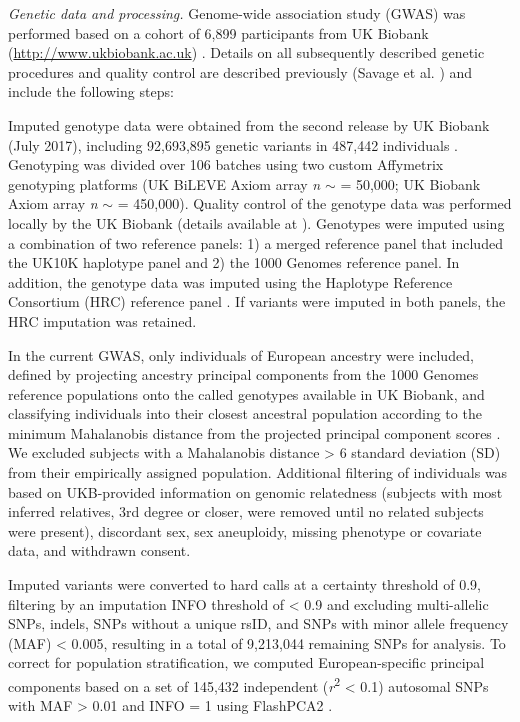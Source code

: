 \begin{refsection}
\noindent
\textit{Genetic data and processing.} Genome-wide association study (GWAS) was performed based on a cohort of 6,899 participants from UK Biobank (\url{http://www.ukbiobank.ac.uk}) \citep{sudlow2015uk}. Details on all subsequently described genetic procedures and quality control are described previously (Savage et al. \citep{Savage2018GenomewideAM}) and include the following steps:

Imputed genotype data were obtained from the second release by UK Biobank (July 2017), including 92,693,895 genetic variants in 487,442 individuals \citep{Bycroft2018TheUB}. Genotyping was divided over 106 batches using two custom Affymetrix genotyping platforms (UK BiLEVE Axiom array \textit{n} $ \sim $ = 50,000; UK Biobank Axiom array \textit{n} $ \sim $ = 450,000). Quality control of the genotype data was performed locally by the UK Biobank (details available at \citep{sudlow2015uk}). Genotypes were imputed using a combination of two reference panels: 1) a merged reference panel that included the UK10K haplotype panel and 2) the 1000 Genomes reference panel. In addition, the genotype data was imputed using the Haplotype Reference Consortium (HRC) reference panel \citep{McCarthy2016ARP}. If variants were imputed in both panels, the HRC imputation was retained.

In the current GWAS, only individuals of European ancestry were included, defined by projecting ancestry principal components from the 1000 Genomes reference populations \citep{Auton2015AGR} onto the called genotypes available in UK Biobank, and classifying individuals into their closest ancestral population according to the minimum Mahalanobis distance from the projected principal component scores \citep{Webb2017MolecularGI}. We excluded subjects with a Mahalanobis distance > 6 standard deviation (SD) from their empirically assigned population. Additional filtering of individuals was based on UKB-provided information on genomic relatedness (subjects with most inferred relatives, 3rd degree or closer, were removed until no related subjects were present), discordant sex, sex aneuploidy, missing phenotype or covariate data, and withdrawn consent.

Imputed variants were converted to hard calls at a certainty threshold of 0.9, filtering by an imputation INFO threshold of < 0.9 and excluding multi-allelic SNPs, indels, SNPs without a unique rsID, and SNPs with minor allele frequency (MAF) < 0.005, resulting in a total of 9,213,044 remaining SNPs for analysis. To correct for population stratification, we computed European-specific principal components based on a set of 145,432 independent (\textit{r}\textsuperscript{2 }< 0.1) autosomal SNPs with MAF > 0.01 and INFO = 1 using FlashPCA2 \citep{Abraham2016FlashPCA2PC}.


\end{refsection}
